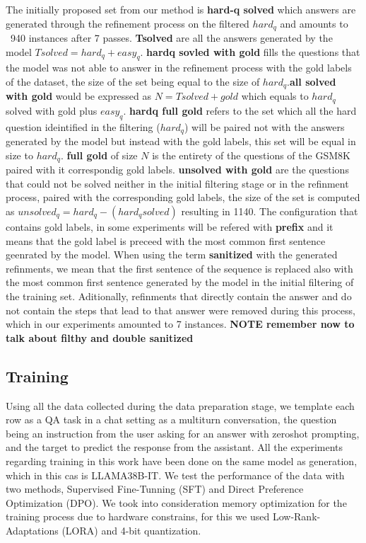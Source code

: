 \documentclass[a4paper,10pt]{article}
\begin{document}
The initially proposed set from our method is \textbf{hard-q solved} which answers are generated through the refinement process on the filtered $hard_q$ and amounts to ~940 instances after 7 passes. \textbf{Tsolved} are all the answers generated by the model $Tsolved = hard_q + easy_q$.  \textbf{hardq sovled with gold} fills the questions that the model was not able to answer in the refinement process with the gold labels of the dataset, the size of the set being equal to the size of $hard_q$.\textbf{all solved with gold} would be expressed as $N = Tsolved + gold$ which equals to $hard_q$ solved with gold plus $easy_q$. \textbf{hardq full gold} refers to the set which all the hard question ideintified in the filtering ($hard_q$) will be paired not with the answers generated by the model but instead with the gold labels, this set will be equal in size to $hard_q$. \textbf{full gold} of size $N$ is the entirety of the questions of the GSM8K paired with it correspondig gold labels. \textbf{unsolved with gold} are the questions that could not be solved neither in the initial filtering stage or in the refinment process, paired with the corresponding gold labels, the size of the set is computed as $unsolved_q = hard_q - (hard_q solved)$ resulting in 1140. The configuration that contains gold labels, in some experiments will be refered with \textbf{prefix} and it means that the gold label is preceed with the most common first sentence geenrated by the model. When using the term \textbf{sanitized} with the generated refinments, we mean that the first sentence of the sequence is replaced also with the most common first sentence generated by the model in the initial filtering of the training set. Aditionally, refinments that directly contain the answer and do not contain the steps that lead to that answer were removed during this process, which in our experiments amounted to 7 instances. \textbf{NOTE remember now to talk about filthy and double sanitized}
\subsection{Training}
Using all the data collected during the data preparation stage, we template each row as a QA task in a chat setting as a multiturn conversation, the question being an instruction from the user asking for an answer with zeroshot prompting, and the target to predict the response from the assistant. All the experiments regarding training in this work have been done on the same model as generation, which in this cas is LLAMA38B-IT. We test the performance of the data with two methods, Supervised Fine-Tunning (SFT) and Direct Preference Optimization (DPO). We took into consideration memory optimization for the training process due to hardware constrains, for this we used Low-Rank-Adaptations (LORA) and 4-bit quantization.
\end{document}
